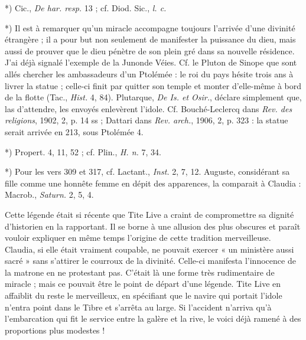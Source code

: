 \documentclass[a4paper, 11pt, oneside, polutonikogreek, french]{article}
\begin{document}
*) Cic., \emph{De har. resp.} 13 ; cf. Diod. Sic., \emph{l. c.}

*) Il est à remarquer qu'un miracle accompagne toujours l'arrivée d'une divinité étrangère ; il a pour but non seulement de manifester la puissance du dieu, mais aussi de prouver que le dieu pénètre de son plein gré dans sa nouvelle résidence. J'ai déjà signalé l'exemple de la Junonde Véies. Cf. le Pluton de Sinope que sont allés chercher les ambassadeurs d'un Ptolémée : le roi du pays hésite trois ans à livrer la statue ; celle-ci finit par quitter son temple et monter d'elle-même à bord de la flotte (Tac., \emph{Hist.} 4, 84). Plutarque, \emph{De Is. et Osir.}, déclare simplement que, las d'attendre, les envoyés enlevèrent l'idole. Cf. Bouché-Leclercq dans \emph{Rev. des religions}, 1902, 2, p. 14 ss ; Dattari dans \emph{Rev. arch.}, 1906, 2, p. 323 : la statue serait arrivée en 213, sous Ptolémée 4.

*) Propert. 4, 11, 52 ; cf. Plin., \emph{H. n.} 7, 34.

*) Pour les vers 309 et 317, cf. Lactant., \emph{Inst.} 2, 7, 12. Auguste, considérant sa fille comme une honnête femme en dépit des apparences, la comparait à Claudia : Macrob., \emph{Saturn.} 2, 5, 4.

Cette légende était si récente que Tite Live a craint de compromettre sa dignité d'historien en la rapportant. Il se borne à une allusion des plus obscures et paraît vouloir expliquer en même temps l'origine de cette tradition merveilleuse. Claudia, si elle était vraiment coupable, ne pouvait exercer « un ministère aussi sacré » sans s'attirer le courroux de la divinité. Celle-ci manifesta l'innocence de la matrone en ne protestant pas. C'était là une forme très rudimentaire de miracle ; mais ce pouvait être le point de départ d'une légende. Tite Live en affaiblit du reste le merveilleux, en spécifiant que le navire qui portait l'idole n'entra point dans le Tibre et s'arrêta au large. Si l'accident n'arriva qu'à l'embarcation qui fit le service entre la galère et la rive, le voici déjà ramené à des proportions plus modestes !
\end{document}
